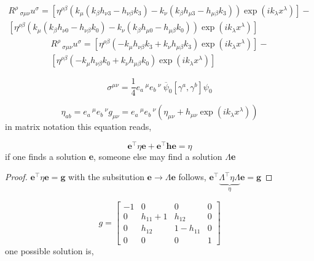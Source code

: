 \documentclass[12pt,a4paper]{article}
\begin{document}
	\begin{multline}
		R^{\rho}\,_{\sigma \mu \nu}u^\sigma = \left[\eta^{\rho \beta}\left(k_\mu \left(k_\beta h_{\nu 3} - h_{\nu \beta}  k_3
		 \right) - k_\nu \left( k_\beta h_{\mu 3} - h_{\mu \beta}  k_3 \right) \right) \exp\left(i k_{\lambda} x^{\lambda}\right)\right] - \\
		\left[\eta^{\rho \beta}\left(k_\mu \left(k_\beta h_{\nu 0} - h_{\nu \beta}  k_0 \right) - k_\nu \left( k_\beta h_{\mu 0} - h_{\mu \beta}  k_0\right) \right) \exp\left(i k_{\lambda} x^{\lambda}\right)\right] 
	\end{multline}
	\begin{multline}
		R^{\rho}\,_{\sigma \mu \nu}u^\sigma = \left[\eta^{\rho \beta}\left(- k_\mu  h_{\nu \beta}  k_3 + k_\nu h_{\mu \beta}  k_3  \right) \exp\left(i k_{\lambda} x^{\lambda}\right)\right] - \\
		\left[\eta^{\rho \beta}\left( - k_\mu  h_{\nu \beta}  k_0 + k_\nu  h_{\mu \beta}  k_0 \right) \exp\left(i k_{\lambda} x^{\lambda}\right)\right] 
	\end{multline}

	
	
	$$
	\sigma^{\mu \nu} = \frac{1}{4} e_a\,^\mu e_b\,^\nu \  \overbar{\psi}_0 \left[\gamma^a, \gamma^b \right]\psi_0
	$$
	
	
	$$
	\eta_{ab} = e_a\,^\mu e_b\,^\nu g_{\mu \nu} = e_a\,^\mu e_b\,^\nu\left( \eta_{\mu \nu} + h_{\mu \nu}\exp\left(i k_{\lambda} x^{\lambda}\right)\right)
	$$
	in matrix notation this equation reads,
	
	$$
	\textbf{e}^\top \textbf{$\eta$}\textbf{e} + \textbf{e}^\top\textbf{h}\textbf{e} = \textbf{$\eta$}
	$$
	if one finds a solution \textbf{e}, someone else may find a solution $ \Lambda$\textbf{e}
	
	\begin{proof}
		$\textbf{e}^\top \eta\textbf{e} = \textbf{g}$
		with the subsitution $\textbf{e} \rightarrow \Lambda\textbf{e} $ follows, $\textbf{e}^\top \underbrace{\Lambda^\top \eta \Lambda}_{\eta}\textbf{e} = \textbf{g} $
	\end{proof}
	
	
	
	$$
	g = \left[\begin{matrix}-1 & 0 & 0 & 0\\0 & h_{11} + 1 & h_{12} & 0\\0 & h_{12} & 1 - h_{11} & 0\\0 & 0 & 0 & 1\end{matrix}\right]
	$$
	one possible solution is,
	
\end{document}
